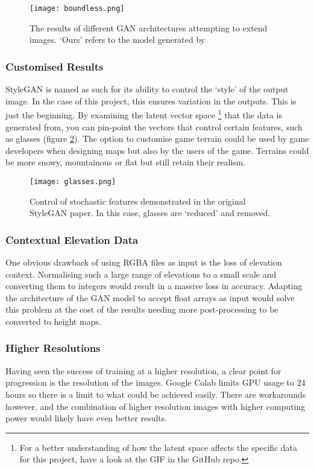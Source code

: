 \documentclass[a4paper]{report}
\begin{document}
\begin{figure}[H]
    \centering
        \texttt{[image: boundless.png]}
        \caption{The results of different GAN architectures attempting to extend images. `Ours' refers to the model generated by \cite{boundless}}
        \label{fig:boundless}
\end{figure}

\subsubsection{Customised Results}
StyleGAN is named as such for its ability to control the `style' of the output image. In the case of this project, this ensures variation in the outputs. This is just the beginning. By examining the latent vector space \footnote{For a better understanding of how the latent space affects the specific data for this project, have a look at the GIF in the GitHub repo.} that the data is generated from, you can pin-point the vectors that control certain features, such as glasses (figure \ref{fig:glasses}). The option to customise game terrain could be used by game developers when designing maps but also by the users of the game. Terrains could be more snowy, mountainous or flat but still retain their realism.

\begin{figure}[H]
    \centering
        \texttt{[image: glasses.png]}
        \caption{Control of stochastic features demonstrated in the original StyleGAN paper. In this case, glasses are `reduced' and removed.}
        \label{fig:glasses}
\end{figure}


\subsubsection{Contextual Elevation Data}
One obvious drawback of using RGBA files as input is the loss of elevation context. Normalising such a large range of elevations to a small scale and converting them to integers would result in a massive loss in accuracy. Adapting the architecture of the GAN model to accept float arrays as input would solve this problem at the cost of the results needing more post-processing to be converted to height maps.

\subsubsection{Higher Resolutions}
Having seen the success of training at a higher resolution, a clear point for progression is the resolution of the images. Google Colab limits GPU usage to 24 hours so there is a limit to what could be achieved easily. There are workarounds however, and the combination of higher resolution images with higher computing power would likely have even better results.
\end{document}
